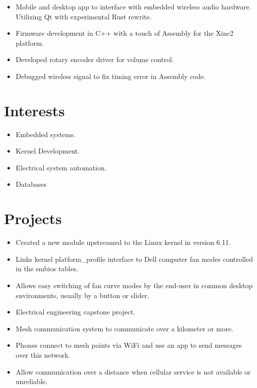 \documentclass{lsanche_cv}
\begin{document}
\begin{multicols}{2}
	\divider

    \begin{itemize}
		\item Mobile and desktop app to interface with embedded wireless audio hardware. Utilizing Qt with experimental Rust rewrite.
		\item Firmware development in C++ with a touch of Assembly for the Xinc2 platform.
		\item Developed rotary encoder driver for volume control.
		\item Debugged wireless signal to fix timing error in Assembly code.
    \end{itemize}

    \columnbreak
    
  \section{Interests}
    \begin{itemize}
      \item Embedded systems.
			\item Kernel Development.
			\item Electrical system automation.
			\item Databases
    \end{itemize}

    \section{Projects}

			\begin{itemize}
				\item Created a new module upstreamed to the Linux kernel in version 6.11.
				\item Links kernel platform\_profile interface to Dell computer fan modes controlled in the smbios tables.
				\item Allows easy switching of fan curve modes by the end-user in common desktop environments, usually by a button or slider.
			\end{itemize}

		\divider

      \begin{itemize}
        \item Electrical engineering capstone project.
        \item Mesh communication system to communicate over a kilometer or more. 
        \item Phones connect to mesh points via WiFi and use an app to send messages over this network.
        \item Allow communication over a distance when cellular service is not available or unreliable.
      \end{itemize}


\end{multicols}
\end{document}
